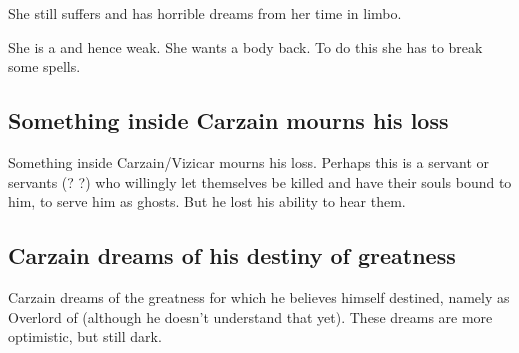 She still suffers and has horrible dreams from her time in limbo. 



She is a  and hence weak. 
She wants a body back. 
To do this she has to break some spells. 









\subsection{Something inside Carzain mourns his loss}
Something inside Carzain/Vizicar mourns his loss. Perhaps this is a servant or servants (\humans? \resphain?) who willingly let themselves be killed and have their souls bound to him, to serve him as ghosts. But he lost his ability to hear them.










\subsection{Carzain dreams of his destiny of greatness}
Carzain dreams of the greatness for which he believes himself destined, namely as Overlord of \Mystraacht{} (although he doesn't understand that yet). 
These dreams are more optimistic, but still dark. 

